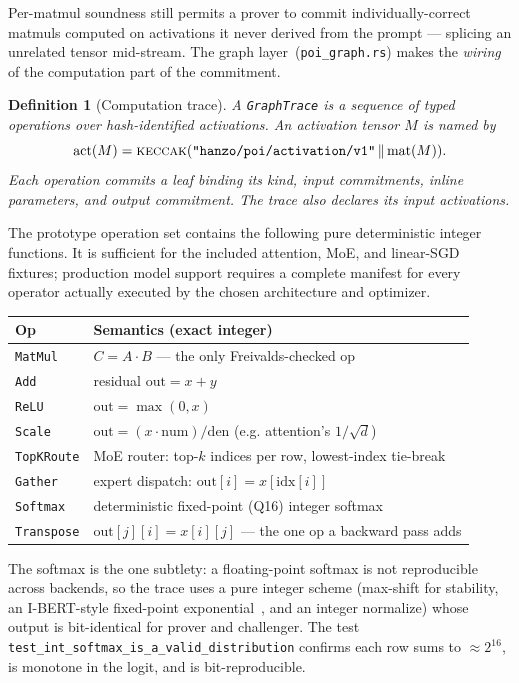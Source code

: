\documentclass[11pt,a4paper]{article}
\newtheorem{definition}{Definition}
\begin{document}
Per-matmul soundness still permits a prover to commit individually-correct matmuls computed on activations it never derived from the prompt --- splicing an unrelated tensor mid-stream. The graph layer~(\texttt{poi\_graph.rs}) makes the \emph{wiring} of the computation part of the commitment.

\begin{definition}[Computation trace]
A \texttt{GraphTrace} is a sequence of typed operations over hash-identified activations. An activation tensor $M$ is named by
\[
  \mathrm{act}(M)=\textsc{keccak}(\texttt{"hanzo/poi/activation/v1"}\,\|\,\mathrm{mat}(M)).
\]
Each operation commits a leaf binding its kind, input commitments, inline parameters, and output commitment. The trace also declares its input activations.
\end{definition}

The prototype operation set contains the following pure deterministic integer functions. It is sufficient for the included attention, MoE, and linear-SGD fixtures; production model support requires a complete manifest for every operator actually executed by the chosen architecture and optimizer.
\begin{center}
\begin{tabular}{ll}
\toprule
\textbf{Op} & \textbf{Semantics (exact integer)} \\
\midrule
\texttt{MatMul} & $C = A\cdot B$ --- the only Freivalds-checked op \\
\texttt{Add} & residual $\text{out} = x + y$ \\
\texttt{ReLU} & $\text{out} = \max(0, x)$ \\
\texttt{Scale} & $\text{out} = (x \cdot \text{num}) / \text{den}$ (e.g. attention's $1/\sqrt{d}$) \\
\texttt{TopKRoute} & MoE router: top-$k$ indices per row, lowest-index tie-break \\
\texttt{Gather} & expert dispatch: $\text{out}[i] = x[\text{idx}[i]]$ \\
\texttt{Softmax} & deterministic fixed-point (Q16) integer softmax \\
\texttt{Transpose} & $\text{out}[j][i] = x[i][j]$ --- the one op a backward pass adds \\
\bottomrule
\end{tabular}
\end{center}

The softmax is the one subtlety: a floating-point softmax is not reproducible across backends, so the trace uses a pure integer scheme (max-shift for stability, an I-BERT-style fixed-point exponential~\cite{ibert}, and an integer normalize) whose output is bit-identical for prover and challenger. The test \texttt{test\_int\_softmax\_is\_a\_valid\_distribution} confirms each row sums to $\approx 2^{16}$, is monotone in the logit, and is bit-reproducible.
\end{document}
